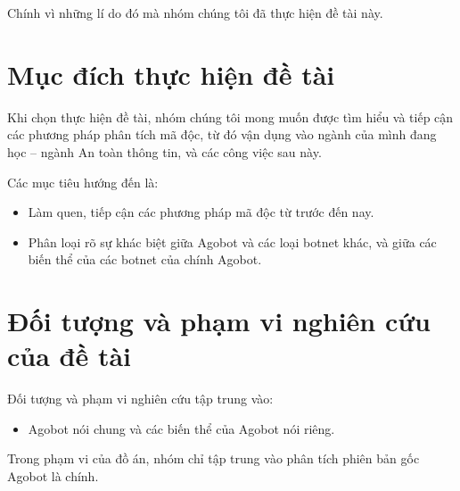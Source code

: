 Chính vì những lí do đó mà nhóm chúng tôi đã thực hiện đề tài này.

\section*{Mục đích thực hiện đề tài}
Khi chọn thực hiện đề tài, nhóm chúng tôi mong muốn được tìm hiểu và tiếp cận các
phương pháp phân tích mã độc, từ đó vận dụng vào ngành của mình đang học – ngành
An toàn thông tin, và các công việc sau này.

Các mục tiêu hướng đến là:

\begin{itemize}
\item Làm quen, tiếp cận các phương pháp mã độc từ trước đến nay.
\item Phân loại rõ sự khác biệt giữa Agobot và các loại botnet khác, và giữa các biến
thể của các botnet của chính Agobot.
\end{itemize}

\section*{Đối tượng và phạm vi nghiên cứu của đề tài}
Đối tượng và phạm vi nghiên cứu tập trung vào:

\begin{itemize}
\item Agobot nói chung và các biến thể của Agobot nói riêng.
\end{itemize}

Trong phạm vi của đồ án, nhóm chỉ tập trung vào phân tích phiên bản gốc Agobot là
chính.

